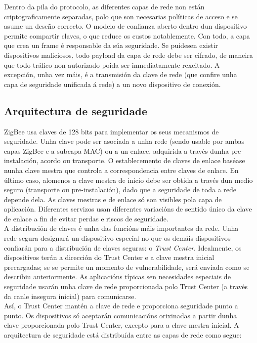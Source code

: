  Dentro da pila do protocolo, as diferentes capas de rede non están
 criptograficamente separadas, polo que son necesarias políticas de acceso e se
 asume un deseño correcto. O modelo de confianza aberto dentro dun dispositivo
 permite compartir claves, o que reduce os custos notablemente. Con todo, a
 capa que crea un frame é responsable da súa seguridade. Se puidesen existir
 dispositivos maliciosos, todo payload da capa de rede debe ser cifrado, de
 maneira que todo tráfico non autorizado poida ser inmediatamente rexeitado. A
 excepción, unha vez máis, é a transmisión da clave de rede (que confire unha
 capa de seguridade unificada á rede) a un novo dispositivo de conexión.

 \subsection{Arquitectura de seguridade}

 ZigBee usa claves de 128 bits para implementar os seus mecanismos de
 seguridade. Unha clave pode ser asociada a unha rede (sendo usable por ambas
 capas ZigBee e a subcapa MAC) ou a un enlace, adquirida a través dunha
 pre-instalación, acordo ou transporte. O establecemento de claves de enlace
 baséase nunha clave mestra que controla a correspondencia entre claves de
 enlace. En último caso, alomenos a clave mestra de inicio debe ser obtida a
 través dun medio seguro (transporte ou pre-instalación), dado que a seguridade
 de toda a rede depende dela. As claves mestras e de enlace só son visibles
 pola capa de aplicación. Diferentes servizos usan diferentes variacións de
 sentido único da clave de enlace a fin de evitar perdas e riscos de
 seguridade. \\

 A distribución de claves é unha das funcións máis importantes da rede. Unha
 rede segura designará un dispositivo especial no que os demáis dispositivos
 confiarán para a distribución de claves seguras: o \textit{Trust Center}.
 Idealmente, os dispositivos terán a dirección do Trust Center e a clave mestra
 inicial precargadas; se se permite un momento de vulnerabilidade, será enviada
 como se describiu anteriormente. As aplicacións típicas sen necesidades
 especiais de seguridade usarán unha clave de rede proporcionada polo Trust
 Center (a través da canle insegura inicial) para comunicarse. \\

 Así, o Trust Center mantén a clave de rede e proporciona seguridade punto a
 punto. Os dispositivos só aceptarán comunicacións orixinadas a partir dunha
 clave proporcionada polo Trust Center, excepto para a clave mestra inicial. A
 arquitectura de seguridade está distribuída entre as capas de rede como segue:


